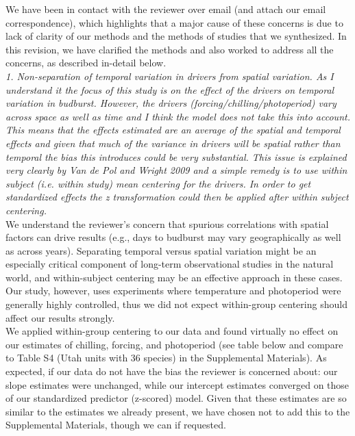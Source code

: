 \documentclass{article}
\begin{document}
We have been in contact with the reviewer over email (and attach our email correspondence), which highlights that a major cause of these concerns is due to lack of clarity of our methods and the methods of studies that we synthesized. In this revision, we have clarified the methods and also worked to address all the concerns, as described in-detail below.\\

\emph{1. Non-separation of temporal variation in drivers from spatial variation. As I understand it the
focus of this study is on the effect of the drivers on temporal variation in budburst. However,
the drivers (forcing/chilling/photoperiod) vary across space as well as time and I think the
model does not take this into account. This means that the effects estimated are an average of
the spatial and temporal effects and given that much of the variance in drivers will be spatial
rather than temporal the bias this introduces could be very substantial. This issue is explained
very clearly by Van de Pol and Wright 2009 and a simple remedy is to use within subject (i.e.
within study) mean centering for the drivers. In order to get standardized effects the z
transformation could then be applied after within subject centering.}\\

We understand the reviewer's concern that spurious correlations with spatial factors can drive results (e.g., days to budburst may vary geographically as well as across years). Separating temporal versus spatial variation might be an especially critical component of long-term observational studies in the natural world, and within-subject centering may be an effective approach in these cases. Our study, however, uses experiments where temperature and photoperiod were generally highly controlled, thus we did not expect within-group centering should affect our results strongly. \\

We applied within-group centering to our data and found virtually no effect on our estimates of chilling, forcing, and photoperiod (see table below and compare to Table S4 (Utah units with 36 species) in the Supplemental Materials). As expected, if our data do not have the bias the reviewer is concerned about: our slope estimates were unchanged, while our intercept estimates converged on those of our standardized predictor (z-scored) model. Given that these estimates are so similar to the estimates we already present, we have chosen not to add this to the Supplemental Materials, though we can if requested.\\
\end{document}
